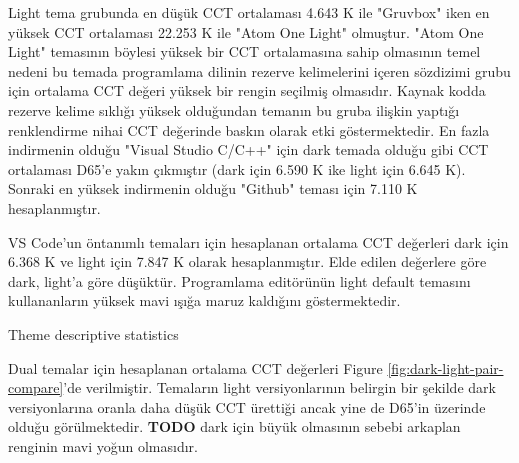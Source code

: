 \documentclass{article}
\begin{document}
Light tema grubunda en düşük CCT ortalaması 4.643 K ile "Gruvbox" iken en yüksek CCT ortalaması 22.253 K ile "Atom
One Light" olmuştur. "Atom One Light" temasının böylesi yüksek bir CCT ortalamasına sahip olmasının temel nedeni bu
temada programlama dilinin rezerve kelimelerini içeren sözdizimi grubu için ortalama CCT değeri yüksek bir rengin
seçilmiş olmasıdır. Kaynak kodda rezerve kelime sıklığı yüksek olduğundan temanın bu gruba ilişkin yaptığı renklendirme
nihai CCT değerinde baskın olarak etki göstermektedir. En fazla indirmenin olduğu "Visual Studio C/C++" için dark temada olduğu gibi CCT
ortalaması D65'e yakın çıkmıştır (dark için 6.590 K ike light için 6.645 K). Sonraki en yüksek indirmenin olduğu "Github" teması için 7.110 K hesaplanmıştır.

VS Code'un öntanımlı temaları için hesaplanan ortalama CCT değerleri dark için 6.368 K ve light için 7.847 K olarak hesaplanmıştır. Elde edilen değerlere göre dark, light'a göre düşüktür. Programlama editörünün light default temasını kullananların yüksek mavi ışığa maruz kaldığını göstermektedir.

  
\begin{table}[H]

	\caption{Theme descriptive statistics}
	\label{tab:descriptive}
\end{table}

Dual temalar için hesaplanan ortalama CCT değerleri Figure \ref{fig:dark-light-pair-compare}'de verilmiştir. Temaların
light versiyonlarının belirgin bir şekilde dark versiyonlarına oranla daha düşük CCT ürettiği ancak yine de D65'in
üzerinde olduğu görülmektedir. \textbf{TODO} dark için büyük olmasının sebebi arkaplan renginin mavi yoğun olmasıdır.

\dualtable
\pgfplotstabletranspose[colnames from=themes]\tabledual{\dualtable}
\end{document}
